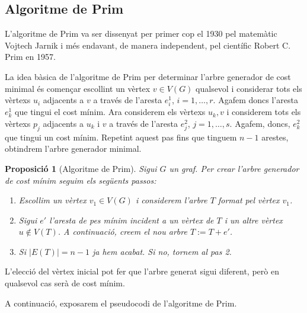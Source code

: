 \documentclass{article}
\newtheorem{prop}{Proposició}[section]
\begin{document}
\subsection{Algoritme de Prim}
L'algoritme de Prim va ser dissenyat per primer cop el 1930 pel matemàtic Vojtech Jarnik i més endavant, de manera independent, pel científic Robert C. Prim en 1957. \cite{12}\par
La idea bàsica de l'algoritme de Prim per determinar l'arbre generador de cost minimal és començar escollint un vèrtex $v\in V(G)$ qualsevol i considerar tots els vèrtexs $u_i$ adjacents a $v$ a través de l'aresta $e_i^1$, $i=1,\ldots,r$. Agafem doncs l'aresta $e_k^1$ que tingui el cost mínim. Ara considerem els vèrtexs $u_k,v$ i considerem tots els vèrtexs $p_j$ adjacents a $u_k$ i $v$ a través de l'aresta $e_j^2$, $j=1,\ldots,s$. Agafem, doncs, $e_k^2$ que tingui un cost mínim. Repetint aquest pas fins que tinguem $n-1$ arestes, obtindrem l’arbre generador minimal.
\begin{prop}[Algoritme de Prim]
    Sigui $G$ un graf. Per crear l'arbre generador de cost mínim seguim els següents passos:
    \begin{enumerate}
        \item Escollim un vèrtex $v_1\in V(G)$ i considerem l’arbre $T$ format pel vèrtex $v_1$.
        \item Sigui $e'$ l’aresta de pes mínim incident a un vèrtex de $T$ i un altre vèrtex $u\notin V(T)$. A continuació, creem el nou arbre $T:=T+e'$.
        \item Si $|E(T)|=n-1$ ja hem acabat. Si no, tornem al pas 2.
    \end{enumerate}
\end{prop}
L’elecció del vèrtex inicial pot fer que l’arbre generat sigui diferent, però en qualsevol cas serà de cost mínim.\par A continuació, exposarem el pseudocodi de l'algoritme de Prim.
\end{document}
